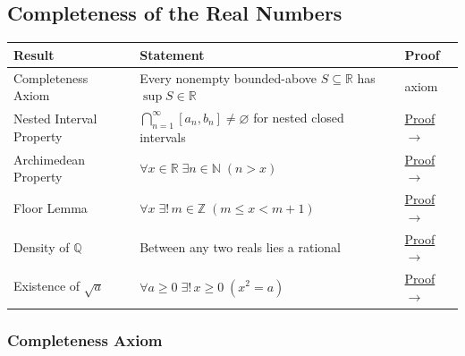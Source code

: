 
\subsection{Completeness of the Real Numbers}

\begin{tcolorbox}[colback=gray!6, colframe=gray!40, arc=2pt,
  left=6pt, right=6pt, top=4pt, bottom=4pt,
  title={\small\textbf{Completeness — Quick Reference}},
  fonttitle=\small\bfseries]
\renewcommand{\arraystretch}{1.4}
\begin{tabular}{@{}p{} p{} p{}@{}}
\textbf{Result} & \textbf{Statement} & \textbf{Proof} \\
\midrule
Completeness Axiom
  & Every nonempty bounded-above $S \subseteq \mathbb{R}$ has $\sup S \in \mathbb{R}$
  & axiom \\
Nested Interval Property
  & $\bigcap_{n=1}^\infty [a_n,b_n] \neq \varnothing$ for nested closed intervals
  & \hyperref[prf:nested-interval-property]{Proof $\to$} \\
Archimedean Property
  & $\forall x \in \mathbb{R}\; \exists n \in \mathbb{N}\; (n > x)$
  & \hyperref[prf:archimedean-property]{Proof $\to$} \\
Floor Lemma
  & $\forall x\; \exists!\, m \in \mathbb{Z}\; (m \le x < m+1)$
  & \hyperref[prf:floor-lemma]{Proof $\to$} \\
Density of $\mathbb{Q}$
  & Between any two reals lies a rational
  & \hyperref[prf:density-of-rationals]{Proof $\to$} \\
Existence of $\sqrt{a}$
  & $\forall a \ge 0\; \exists!\, x \ge 0\; (x^2 = a)$
  & \hyperref[prf:existence-of-square-roots]{Proof $\to$} \\
\end{tabular}
\end{tcolorbox}


\subsubsection{Completeness Axiom}

